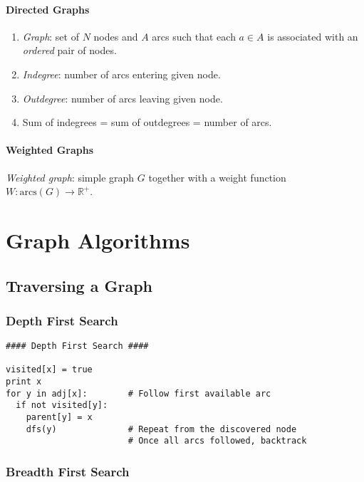\documentclass[twocolumn,english]{article}
\begin{document}
\paragraph{Directed Graphs}
\begin{enumerate}
\item \emph{Graph}: set of $N$ nodes and $A$ arcs such that each $a\in A$
is associated with an \emph{ordered} pair of nodes.
\item \emph{Indegree}: number of arcs entering given node.
\item \emph{Outdegree}: number of arcs leaving given node.
\item Sum of indegrees = sum of outdegrees = number of arcs.
\end{enumerate}

\paragraph{Weighted Graphs}

\emph{Weighted graph}: simple graph $G$ together with a weight function
$W:\mbox{arcs}\left(G\right)\rightarrow\mathbb{R}^{+}$.


\section{Graph Algorithms}


\subsection{Traversing a Graph}


\subsubsection{Depth First Search}

\begin{lstlisting}[basicstyle={\footnotesize\ttfamily}]
#### Depth First Search ####

visited[x] = true
print x
for y in adj[x]:        # Follow first available arc
  if not visited[y]:
    parent[y] = x
    dfs(y)              # Repeat from the discovered node
                        # Once all arcs followed, backtrack
\end{lstlisting}



\subsubsection{Breadth First Search}
\end{document}
